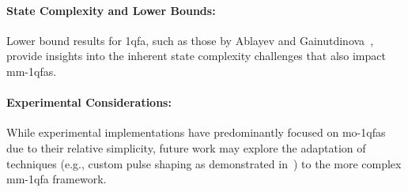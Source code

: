 \paragraph{State Complexity and Lower Bounds:} Lower bound results for \gls{1qfa}, such as those by Ablayev and Gainutdinova~\cite{ablayev2000lower}, provide insights into the inherent state complexity challenges that also impact \glspl{mm-1qfa}.
 
\paragraph{Experimental Considerations:} While experimental implementations have predominantly focused on \gls{mo-1qfa}s due to their relative simplicity, future work may explore the adaptation of techniques (e.g., custom pulse shaping as demonstrated in~\cite{lussi2024implementing}) to the more complex \gls{mm-1qfa} framework.

